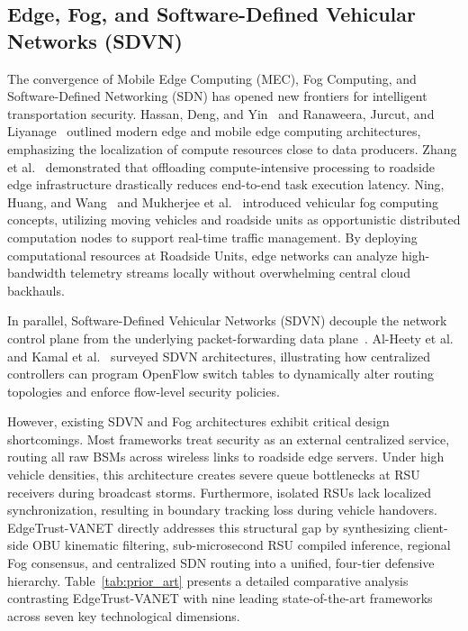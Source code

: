 \documentclass[conference]{IEEEtran}
\begin{document}
\subsection{Edge, Fog, and Software-Defined Vehicular Networks (SDVN)}

The convergence of Mobile Edge Computing (MEC), Fog Computing, and Software-Defined Networking (SDN) has opened new frontiers for intelligent transportation security. Hassan, Deng, and Yin~\cite{shi2016edge} and Ranaweera, Jurcut, and Liyanage~\cite{mao2017mec} outlined modern edge and mobile edge computing architectures, emphasizing the localization of compute resources close to data producers. Zhang et al.~\cite{fogvanet} demonstrated that offloading compute-intensive processing to roadside edge infrastructure drastically reduces end-to-end task execution latency. Ning, Huang, and Wang~\cite{ning2019mec} and Mukherjee et al.~\cite{hou2016vehicularfog} introduced vehicular fog computing concepts, utilizing moving vehicles and roadside units as opportunistic distributed computation nodes to support real-time traffic management. By deploying computational resources at Roadside Units, edge networks can analyze high-bandwidth telemetry streams locally without overwhelming central cloud backhauls.

In parallel, Software-Defined Vehicular Networks (SDVN) decouple the network control plane from the underlying packet-forwarding data plane~\cite{sdnvanet, kamal2020sdn}. Al-Heety et al.~\cite{sdnvanet} and Kamal et al.~\cite{kamal2020sdn} surveyed SDVN architectures, illustrating how centralized controllers can program OpenFlow switch tables to dynamically alter routing topologies and enforce flow-level security policies.

However, existing SDVN and Fog architectures exhibit critical design shortcomings. Most frameworks treat security as an external centralized service, routing all raw BSMs across wireless links to roadside edge servers. Under high vehicle densities, this architecture creates severe queue bottlenecks at RSU receivers during broadcast storms. Furthermore, isolated RSUs lack localized synchronization, resulting in boundary tracking loss during vehicle handovers. EdgeTrust-VANET directly addresses this structural gap by synthesizing client-side OBU kinematic filtering, sub-microsecond RSU compiled inference, regional Fog consensus, and centralized SDN routing into a unified, four-tier defensive hierarchy. Table~\ref{tab:prior_art} presents a detailed comparative analysis contrasting EdgeTrust-VANET with nine leading state-of-the-art frameworks across seven key technological dimensions.
\end{document}
